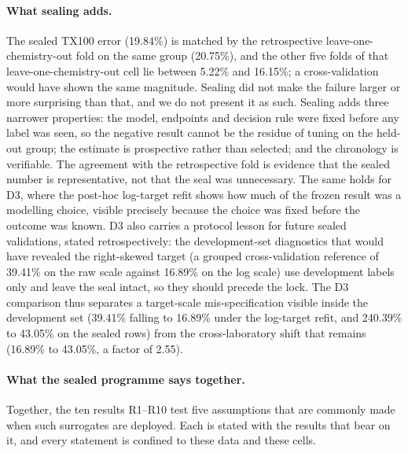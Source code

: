\documentclass[11pt,a4paper]{article}
\newcommand{\tox}{TX100}
\begin{document}
\paragraph{What sealing adds.} The sealed \tox{} error (19.84\%) is matched
by the retrospective leave-one-chemistry-out fold on the same group
(20.75\%), and the other five folds of that leave-one-chemistry-out cell lie between 5.22\% and
16.15\%; a
cross-validation would have shown the same magnitude. Sealing did not make
the failure larger or more surprising than that, and we do not present it as
such. Sealing adds three narrower properties: the model, endpoints and decision rule were
fixed before any label was seen, so the negative result cannot be the
residue of tuning on the held-out group; the estimate is prospective rather
than selected; and the chronology is verifiable. The agreement with the
retrospective fold is evidence that the sealed number is representative, not
that the seal was unnecessary. The same holds for D3, where the post-hoc
log-target refit shows how much of the frozen result was a modelling
choice, visible precisely because the choice was fixed before the outcome
was known. D3 also carries a protocol lesson for future sealed validations, stated
retrospectively: the development-set diagnostics that would have revealed the
right-skewed target (a grouped cross-validation reference of 39.41\% on the
raw scale against 16.89\% on the log scale) use development labels only and
leave the seal intact, so they should precede the lock. The D3
comparison thus separates a target-scale mis-specification visible inside the
development set (39.41\% falling to 16.89\% under the log-target refit, and
240.39\% to 43.05\% on the sealed rows) from the cross-laboratory shift that remains (16.89\% to 43.05\%, a factor
of 2.55).

\paragraph{What the sealed programme says together.} Together, the ten results R1--R10
test five assumptions that are commonly made when such surrogates are
deployed. Each is stated with the results that bear on it, and every
statement is confined to these data and these cells.
\end{document}
